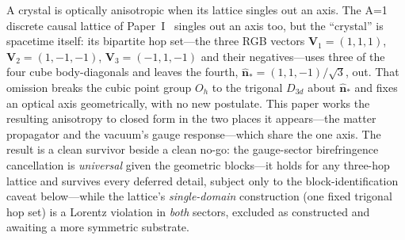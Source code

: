
\label{sec:introduction}

A crystal is optically anisotropic when its lattice singles out an axis. The A=1
discrete causal lattice of Paper~I~\cite{menendez2026geometryfirst} singles out an
axis too, but the ``crystal'' is spacetime itself: its bipartite hop set---the three
RGB vectors $\mathbf{V}_1=(1,1,1)$, $\mathbf{V}_2=(1,-1,-1)$,
$\mathbf{V}_3=(-1,1,-1)$ and their negatives---uses three of the four cube
body-diagonals and leaves the fourth, $\hat{\mathbf{n}}_* = (1,1,-1)/\sqrt3$, out.
That omission breaks the cubic point group $O_h$ to the trigonal $D_{3d}$ about
$\hat{\mathbf{n}}_*$ and fixes an optical axis geometrically, with no new postulate.
This paper works the resulting anisotropy to closed form in the two places it
appears---the matter propagator and the vacuum's gauge response---which share the
one axis. The result is a clean survivor beside a clean no-go: the gauge-sector
birefringence cancellation is \emph{universal} given the geometric blocks---it holds for
any three-hop lattice and survives every deferred detail, subject only to the
block-identification caveat below---while the lattice's \emph{single-domain} construction
(one fixed trigonal hop set) is a Lorentz violation in \emph{both} sectors, excluded as
constructed and awaiting a more symmetric substrate.

